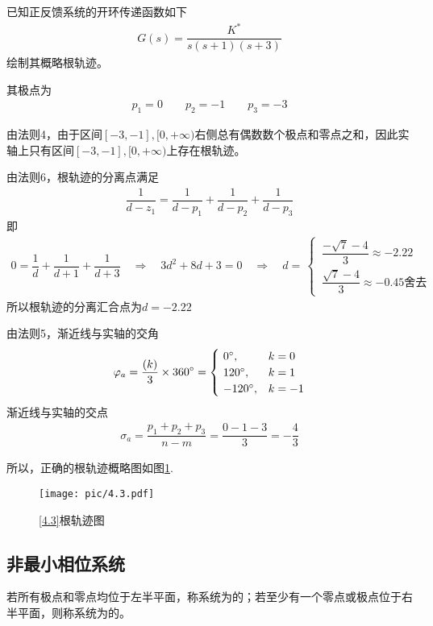 \vspace*{-1em}

\examples \label{4.3}已知正反馈系统的开环传递函数如下
\begin{align}
	G(s) = \dfrac{K^*}{s(s+1)(s+3)}
\end{align}
绘制其概略根轨迹。

\solve 其极点为
\begin{align*}
	p_1 = 0 \quad \quad p_2 = -1 \quad \quad p_3 = -3
\end{align*}

由法则4，由于区间$[-3,-1],[0,+\infty)$右侧总有偶数数个极点和零点之和，因此实轴上只有区间$[-3,-1],[0,+\infty)$上存在根轨迹。

由法则6，根轨迹的分离点满足
\begin{align*}
	\dfrac{1}{d - z_1} = \dfrac{1}{d - p_1} + \dfrac{1}{d - p_2} + \dfrac{1}{d - p_3}
\end{align*}
即
\begin{align*}
	0 = \dfrac{1}{d} + \dfrac{1}{d + 1} + \dfrac{1}{d + 3} \quad \Rightarrow \quad 
	3d^2 + 8d + 3 = 0 \quad \Rightarrow \quad d = \,
	\begin{cases}
		\, \dfrac{- \sqrt{7} - 4 }{3} \approx -2.22 \\[0.5em]
		\, \dfrac{\sqrt{7} - 4}{3} \approx  -0.45 \mbox{舍去}
	\end{cases}
\end{align*}
所以根轨迹的分离汇合点为$d = -2.22 $

由法则5，渐近线与实轴的交角
\begin{align*}
	\varphi_a = \dfrac{(k)}{3} \times 360{}^{\circ} =
	\begin{cases}
		\,\, 0{}^{\circ}, &k = 0\\
		\,\, 120 {}^{\circ}, & k = 1\\
		\,\, -120 {}^{\circ}, & k = -1
	\end{cases} 
\end{align*}
渐近线与实轴的交点
\begin{align*}
	\sigma_a = \dfrac{p_1 + p_2 + p_3}{n - m} = \dfrac{0 -1 - 3 }{3} = -\dfrac{4}{3}
\end{align*}

所以，正确的根轨迹概略图如图\ref{F4.3}.


\begin{figure}[!htb]
	\centering
	\texttt{[image: pic/4.3.pdf]}
	\caption{\ref{4.3}根轨迹图}
	\label{F4.3}
\end{figure}
\clearpage

\subsection{非最小相位系统}
若所有极点和零点均位于左半平面，称系统为的；若至少有一个零点或极点位于右半平面，则称系统为的。

